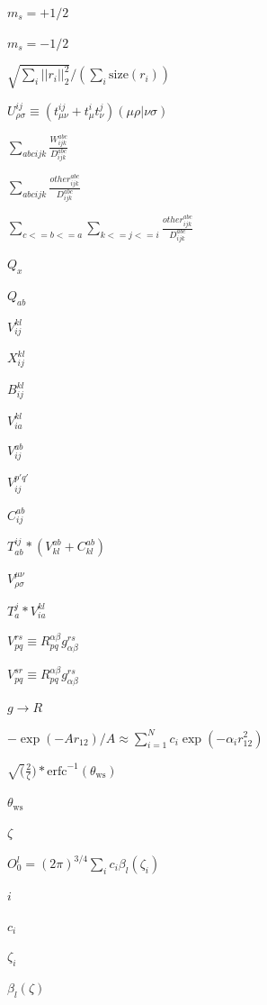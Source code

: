 \documentclass{article}
\begin{document}
$ m_s=+1/2 $
\pagebreak

$ m_s=-1/2 $
\pagebreak

$ \sqrt{\sum_i ||r_i||_2^2}/(\sum_i \mathrm{size}(r_i)) $
\pagebreak

$ U^{ij}_{\rho\sigma} \equiv \left( t^{ij}_{\mu \nu} + t^{i}_{\mu} t^{j}_{\nu} \right) (\mu \rho| \nu \sigma) $
\pagebreak

$ \sum_{abcijk} \frac{W^{abc}_{ijk}}{D^{abc}_{ijk}} $
\pagebreak

$ \sum_{abcijk} \frac{other^{abc}_{ijk}}{D^{abc}_{ijk}} $
\pagebreak

$ \sum_{c<=b<=a} \sum_{k<=j<=i} \frac{other^{abc}_{ijk}}{D^{abc}_{ijk}} $
\pagebreak

$ Q_x $
\pagebreak

$ Q_{ab} $
\pagebreak

$V_{ij}^{kl}$
\pagebreak

$X_{ij}^{kl}$
\pagebreak

$B_{ij}^{kl}$
\pagebreak

$V_{ia}^{kl}$
\pagebreak

$V_{ij}^{ab}$
\pagebreak

$V_{ij}^{p'q'}$
\pagebreak

$C_{ij}^{ab}$
\pagebreak

$T_{ab}^{ij} * (V_{kl}^{ab} + C_{kl}^{ab})$
\pagebreak

$V_{\rho \sigma}^{\mu \nu}$
\pagebreak

$T_{a}^{j} * V_{ia}^{kl}$
\pagebreak

$V_{pq}^{rs} \equiv R_{pq}^{\alpha \beta} g_{\alpha \beta}^{r s}$
\pagebreak

$V_{pq}^{sr} \equiv R_{pq}^{\alpha \beta} g_{\alpha \beta}^{r s}$
\pagebreak

$ g \to R $
\pagebreak

$ - \exp(- A r_{12})/A \approx \sum\limits_{i=1}^N c_i \exp(- \alpha_i r_{12}^2) $
\pagebreak

$ \sqrt(\frac{2}{\zeta}) * \mathrm{erfc}^{-1}(\theta_\mathrm{ws}) $
\pagebreak

$ \theta_\mathrm{ws} $
\pagebreak

$ \zeta $
\pagebreak

$ O^l_0 = (2 \pi)^{3/4} \sum_i c_i \beta_l(\zeta_i) $
\pagebreak

$ i $
\pagebreak

$ c_i $
\pagebreak

$ \zeta_i $
\pagebreak

$ \beta_l(\zeta) $
\pagebreak
\end{document}

